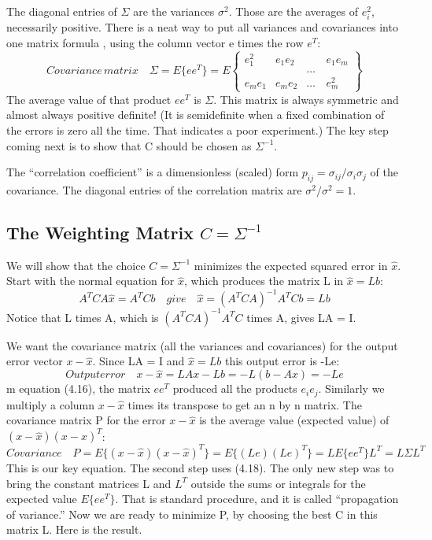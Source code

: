 	The diagonal entries of $\Sigma$ are the variances $\sigma^2$. Those are the averages of $e^2_i$, necessarily positive. There is a neat way to put all variances and covariances into one matrix formula , using the column vector e times the row $e^T$:
	\begin{equation}
	Covariance \,matrix \quad
	\Sigma=E\{ee^T\}=E
	\begin{Bmatrix}
	e^2_1 & e_1e_2 & \quad & e_1e_m \\
	\quad &\quad   & \dots & \quad  \\
	e_me_1&e_me_2  & \dots &e^2_m
	\end{Bmatrix}
	\end{equation}
	The average value of that product $ee^T$ is $\Sigma$. This matrix is always symmetric and almost
	always positive definite! (It is semidefinite when a fixed combination of the errors is zero
	all the time. That indicates a poor experiment.) The key step coming next is to show that
	C should be chosen as $\Sigma^{-1}$.
	
	The “correlation coefficient” is a dimensionless (scaled) form $p_{ij}=\sigma_{ij}/\sigma_i\sigma_j$ of the covariance. The diagonal entries of the correlation matrix are $\sigma^2/\sigma^2=1$.
	
	\subsection{The Weighting Matrix $C=\Sigma^{-1}$}
	We will show that the choice $C=\Sigma^{-1}$ minimizes the expected squared error in $\hat{x}$. Start with the normal equation for $\hat{x}$, which produces the matrix L in $\hat{x}=Lb$:
	\begin{equation}
	A^TCA\hat{x}=A^TCb
	\quad give \quad
	\hat{x}=(A^TCA)^{-1}A^TCb=Lb
	\end{equation}
	Notice that L times A, which is $(A^TCA)^{-1}A^TC$ times A, gives LA = I.
	
	We want the covariance matrix (all the variances and covariances) for the output
	error vector $x-\hat{x}$. Since LA = I and $\hat{x}=Lb$ this output error is -Le:
	\begin{equation}
	Output error \quad
	x-\hat{x}=LAx-Lb=-L(b-Ax)=-Le
	\end{equation}
	m equation (4.16), the matrix $ee^T$ produced all the products $e_ie_j$. Similarly we multiply a
	column $x-\hat{x}$ times its transpose to get an n by n matrix. The covariance matrix P for the
	error $x-\hat{x}$ is the average value (expected value) of $(x-\hat{x})(x-\hat{x})^T$:
	\begin{equation}
	Covariance \quad
	P=E\{(x-\hat{x})(x-\hat{x})^T\}=E\{(Le)(Le)^T\}=LE\{ee^T\}L^T=L\Sigma L^T
	\end{equation}
	This is our key equation. The second step uses (4.18). The only new step was to bring the
	constant matrices L and $L^T$ outside the sums or integrals for the expected value $E\{ee^T\}$.
	That is standard procedure, and it is called “propagation of variance.” Now we are ready
	to minimize P, by choosing the best C in this matrix L. Here is the result.
	
